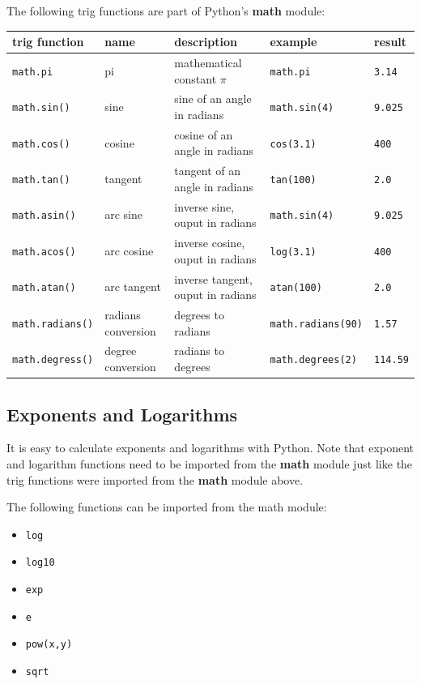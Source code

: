 \documentclass{book}
\providecommand{\tightlist}{%
      \setlength{\itemsep}{0pt}\setlength{\parskip}{0pt}}
\begin{document}
The following trig functions are part of Python's \textbf{math} module:

\begin{longtable}[]{@{}lllll@{}}
\toprule
trig function & name & description & example & result\tabularnewline
\midrule
\endhead
\lstinline!math.pi! & pi & mathematical constant \(\pi\) &
\lstinline!math.pi! & \lstinline!3.14!\tabularnewline
\lstinline!math.sin()! & sine & sine of an angle in radians &
\lstinline!math.sin(4)! & \lstinline!9.025!\tabularnewline
\lstinline!math.cos()! & cosine & cosine of an angle in radians &
\lstinline!cos(3.1)! & \lstinline!400!\tabularnewline
\lstinline!math.tan()! & tangent & tangent of an angle in radians &
\lstinline!tan(100)! & \lstinline!2.0!\tabularnewline
\lstinline!math.asin()! & arc sine & inverse sine, ouput in radians &
\lstinline!math.sin(4)! & \lstinline!9.025!\tabularnewline
\lstinline!math.acos()! & arc cosine & inverse cosine, ouput in radians
& \lstinline!log(3.1)! & \lstinline!400!\tabularnewline
\lstinline!math.atan()! & arc tangent & inverse tangent, ouput in
radians & \lstinline!atan(100)! & \lstinline!2.0!\tabularnewline
\lstinline!math.radians()! & radians conversion & degrees to radians &
\lstinline!math.radians(90)! & \lstinline!1.57!\tabularnewline
\lstinline!math.degress()! & degree conversion & radians to degrees &
\lstinline!math.degrees(2)! & \lstinline!114.59!\tabularnewline
\bottomrule
\end{longtable}

    \subsection{Exponents and Logarithms}\label{exponents-and-logarithms}

It is easy to calculate exponents and logarithms with Python. Note that
exponent and logarithm functions need to be imported from the
\textbf{math} module just like the trig functions were imported from the
\textbf{math} module above.

The following functions can be imported from the math module:

\begin{itemize}
\tightlist
\item
  \lstinline!log!
\item
  \lstinline!log10!
\item
  \lstinline!exp!
\item
  \lstinline!e!
\item
  \lstinline!pow(x,y)!
\item
  \lstinline!sqrt!
\end{itemize}
\end{document}
